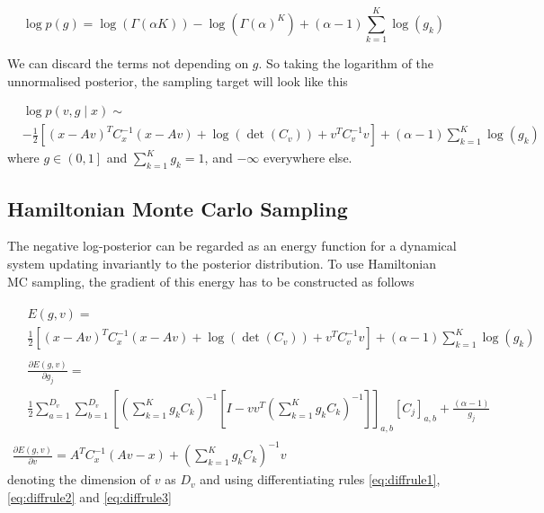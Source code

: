 \documentclass{paper}
\begin{document}
\begin{equation}
\log p(g) = \log(\Gamma(\alpha K)) - \log(\Gamma(\alpha)^K) + (\alpha-1) \sum_{k=1}^K \log(g_k)
\end{equation}

%
We can discard the terms not depending on $g$. So taking the logarithm of the unnormalised posterior, the sampling target will look like this

\begin{equation}
\begin{split}
&\log p(v,g \mid x) \sim \\ 
&-\frac{1}{2} \left[(x-Av)^T C_x^{-1} (x-Av) + \log(\det(C_v)) + v^T C_v^{-1} v\right] + (\alpha-1) \sum_{k=1}^K \log(g_k) \label{eq:log_post}
\end{split}
\end{equation}
%
where $g \in \left(0,1 \right]$ and $\sum_{k=1}^{K} g_k = 1$, and $-\infty$ everywhere else. 

\subsection{Hamiltonian Monte Carlo Sampling}

The negative log-posterior can be regarded as an energy function for a dynamical system updating invariantly to the posterior distribution. To use Hamiltonian MC sampling, the gradient of this energy has to be constructed as follows

\begin{eqnarray}
\begin{split}
&E(g,v) = \\
&\frac{1}{2} \left[(x-Av)^T C_x^{-1} (x-Av) + \log(\det(C_v)) + v^T C_v^{-1} v\right] + (\alpha-1) \sum_{k=1}^K \log(g_k)
\end{split}\\
\begin{split}
&\frac{\partial E(g,v)}{\partial g_j} = \\
&\frac{1}{2} \sum_{a=1}^{D_v} \sum_{b=1}^{D_v} \left[ \left( \sum_{k=1}^K g_k C_k \right)^{-1} \left[ I - vv^T \left( \sum_{k=1}^K g_k C_k \right)^{-1} \right] \right]_{a,b} \left[ C_j \right]_{a,b} + \frac{(\alpha-1)}{g_j}
\end{split}\\
\frac{\partial E(g,v)}{\partial v} = A^T C_x^{-1}(Av-x) + \left( \sum_{k=1}^K g_k C_k \right)^{-1} v
\end{eqnarray}
%
denoting the dimension of $v$ as $D_v$ and using differentiating rules \ref{eq:diffrule1}, \ref{eq:diffrule2} and \ref{eq:diffrule3}
\end{document}
